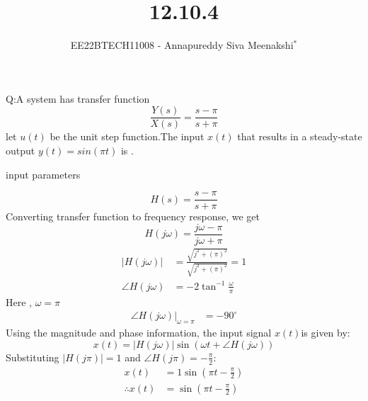 \documentclass[journal,12pt,twocolumn]{IEEEtran}
\theoremstyle{remark}
\begin{document}

\vspace{3cm}

\title{12.10.4}
\author{EE22BTECH11008 - Annapureddy Siva Meenakshi$^{*}$%
}
\maketitle
\bigskip

\renewcommand{\thefigure}{\theenumi}
\renewcommand{\thetable}{\theenumi}
Q:A system has transfer function
 \[\frac{Y(s)}{X(s)}=\frac {s-\pi}{s+\pi}\]
 let $u(t)$ be the unit step function.The input $x(t)$ that results in a steady-state output $y(t)=sin(\pi t)$ is \underline{\quad}.
\solution
\begin{table}[!ht]
    \centering
        
    \caption{input parameters}
    \label{tab:in_21_t1}
\end{table}
 \begin{equation}
     H(s)=\frac{s-\pi}{s+\pi}
 \end{equation} 
 Converting transfer function to frequency response, we get
 \begin{equation}
     H(j\omega)=\frac{j\omega-\pi}{j\omega+\pi}
 \end{equation}
 \begin{align}
     |H(j\omega)|&=\frac{\sqrt{j^2+(\pi)^2}}{\sqrt{j^2+(\pi)^2}}=1\\
     \angle H(j\omega)&=-2\tan^{-1}{\frac{\omega}{\pi}}
 \end{align}
 Here , $\omega=\pi$
 \begin{align}
    \angle H(j\omega)\big|_{\omega=\pi} &= -90^\circ
\end{align}
Using the magnitude and phase information, the input signal $x(t)$is given by:
\begin{equation}
    x(t) = |H(j\omega)|\sin(\omega t + \angle H(j\omega))
\end{equation}
Substituting $|H(j\pi)|=1 $ and $\angle H(j\pi) = -\frac{\pi}{2}$:
\begin{align}
     x(t) &= 1\sin\left(\pi t - \frac{\pi}{2}\right)\\
     \therefore x(t) &= \sin\left(\pi t - \frac{\pi}{2}\right)
\end{align}
 
\end{document}
